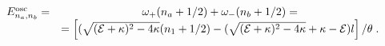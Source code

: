 \begin{equation}\label{oscspectrum}
\begin{array}{cc}
 E^{\rm osc}_{n_a,n_b}=&
 \omega_+(n_a+{1}/{2})
 +\omega_- (n_b+{1}/{2})=\cr
\; &=\left[
 (\sqrt{({\cal E}+\kappa)^2-4\kappa}(n_1+1/2)-
(\sqrt{({\cal E}+\kappa)^2-
4\kappa} +\kappa-{\cal E})l \right]/\theta\; .
\end{array}
\end{equation}

